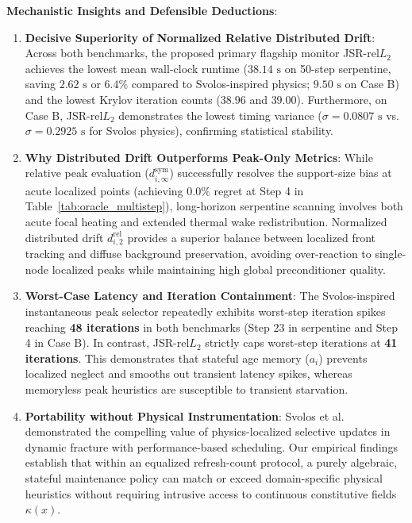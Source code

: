 \documentclass[preprint,12pt,3p]{elsarticle}
\begin{document}
\textbf{Mechanistic Insights and Defensible Deductions}:
\begin{enumerate}
    \item \textbf{Decisive Superiority of Normalized Relative Distributed Drift}: Across both benchmarks, the proposed primary flagship monitor JSR-$\text{rel}L_2$ achieves the lowest mean wall-clock runtime ($38.14\text{ s}$ on 50-step serpentine, saving $2.62\text{ s}$ or $6.4\%$ compared to Svolos-inspired physics; $9.50\text{ s}$ on Case B) and the lowest Krylov iteration counts ($38.96$ and $39.00$). Furthermore, on Case B, JSR-$\text{rel}L_2$ demonstrates the lowest timing variance ($\sigma = 0.0807\text{ s}$ vs.\ $\sigma = 0.2925\text{ s}$ for Svolos physics), confirming statistical stability.
    \item \textbf{Why Distributed Drift Outperforms Peak-Only Metrics}: While relative peak evaluation ($d_{i, \infty}^{\text{sym}}$) successfully resolves the support-size bias at acute localized points (achieving $0.0\%$ regret at Step 4 in Table~\ref{tab:oracle_multistep}), long-horizon serpentine scanning involves both acute focal heating and extended thermal wake redistribution. Normalized distributed drift $d_{i, 2}^{\text{rel}}$ provides a superior balance between localized front tracking and diffuse background preservation, avoiding over-reaction to single-node localized peaks while maintaining high global preconditioner quality.
    \item \textbf{Worst-Case Latency and Iteration Containment}: The Svolos-inspired instantaneous peak selector repeatedly exhibits worst-step iteration spikes reaching \textbf{48 iterations} in both benchmarks (Step 23 in serpentine and Step 4 in Case B). In contrast, JSR-$\text{rel}L_2$ strictly caps worst-step iterations at \textbf{41 iterations}. This demonstrates that stateful age memory ($a_i$) prevents localized neglect and smooths out transient latency spikes, whereas memoryless peak heuristics are susceptible to transient starvation.
    \item \textbf{Portability without Physical Instrumentation}: Svolos et al.~\cite{svolos2020updating} demonstrated the compelling value of physics-localized selective updates in dynamic fracture with performance-based scheduling. Our empirical findings establish that within an equalized refresh-count protocol, a purely algebraic, stateful maintenance policy can match or exceed domain-specific physical heuristics without requiring intrusive access to continuous constitutive fields $\kappa(x)$.
\end{enumerate}
\end{document}
